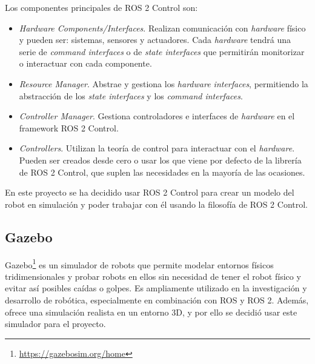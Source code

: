 Los componentes principales de ROS 2 Control son:

\begin{itemize}
	\item \textit{Hardware Components/Interfaces}. Realizan comunicación con \textit{hardware} físico y pueden ser: sistemas, sensores y actuadores. Cada \textit{hardware} tendrá una serie de \textit{command interfaces} o de \textit{state interfaces} que permitirán monitorizar o interactuar con cada componente.
	\item \textit{Resource Manager}. Abstrae y gestiona los \textit{hardware interfaces}, permitiendo la abstracción de los \textit{state interfaces} y los \textit{command interfaces}.
	\item\textit{Controller Manager}. Gestiona controladores e interfaces de \textit{hardware} en el framework ROS 2 Control.
	\item \textit{Controllers}. Utilizan la teoría de control para interactuar con el \textit{hardware}. Pueden ser creados desde cero o usar los que viene por defecto de la librería de ROS 2 Control, que suplen las necesidades en la mayoría de las ocasiones.
\end{itemize}

En este proyecto se ha decidido usar ROS 2 Control para crear un modelo del robot en simulación y poder trabajar con él usando la filosofía de ROS 2 Control.


\subsection{Gazebo}
\label{subsec:gazebo}

Gazebo\footnote{\url{https://gazebosim.org/home}} es un simulador de robots que permite modelar entornos físicos tridimensionales y probar robots en ellos sin necesidad de tener el robot físico y evitar así posibles caídas o golpes. Es ampliamente utilizado en la investigación y desarrollo de robótica, especialmente en combinación con ROS y ROS 2. Además, ofrece una simulación realista en un entorno 3D, y por ello se decidió usar este simulador para el proyecto.


